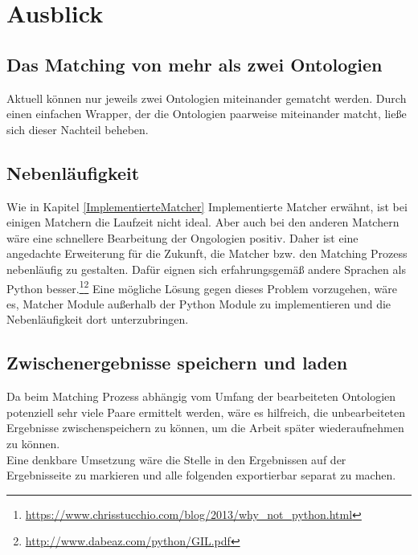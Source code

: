 %
\chapter{Ausblick}
\label{chap:outlook}      

\section{Das Matching von mehr als zwei Ontologien}
Aktuell können nur jeweils zwei Ontologien miteinander gematcht werden. Durch
einen einfachen Wrapper, der die Ontologien paarweise miteinander matcht, ließe
sich dieser Nachteil beheben.

\section{Nebenläufigkeit}
Wie in Kapitel \ref{ImplementierteMatcher} Implementierte Matcher erwähnt, ist
bei einigen Matchern die Laufzeit nicht ideal. Aber auch bei den anderen Matchern wäre eine schnellere
Bearbeitung der Ongologien positiv. Daher ist eine angedachte Erweiterung für
die Zukunft, die Matcher bzw.
den Matching Prozess nebenläufig zu gestalten. Dafür eignen sich erfahrungsgemäß
andere Sprachen als Python
besser.\footnote{\url{https://www.chrisstucchio.com/blog/2013/why_not_python.html}}\footnote{\url{http://www.dabeaz.com/python/GIL.pdf}}
Eine mögliche Lösung gegen dieses Problem vorzugehen, wäre es, Matcher Module
außerhalb der Python Module zu implementieren und die Nebenläufigkeit dort unterzubringen.

\section{Zwischenergebnisse speichern und laden}
Da beim Matching Prozess abhängig vom Umfang der bearbeiteten Ontologien
potenziell sehr viele Paare ermittelt werden, wäre es hilfreich, die
unbearbeiteten Ergebnisse zwischenspeichern zu können, um die Arbeit später
wiederaufnehmen zu können.\\
Eine denkbare Umsetzung wäre die Stelle in den Ergebnissen auf der
Ergebnisseite zu markieren und alle folgenden exportierbar separat zu machen.

